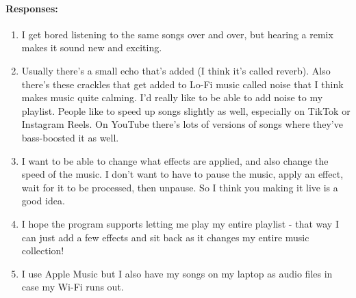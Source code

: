 {{\begin{minipage}{15cm}
			\paragraph{Responses:}
			\begin{enumerate}
				\item I get bored listening to the same songs over and over, but hearing a remix makes it sound new and exciting.
				\item Usually there's a small echo that's added (I think it's called reverb). Also there's these crackles that get added to Lo-Fi music called noise that I think makes music quite calming. I'd really like to be able to add noise to my playlist. People like to speed up songs slightly as well, especially on TikTok or Instagram Reels. On YouTube there's lots of versions of songs where they've bass-boosted it as well. 
				\item I want to be able to change what effects are applied, and also change the speed of the music. I don't want to have to pause the music, apply an effect, wait for it to be processed, then unpause. So I think you making it live is a good idea.
				\item I hope the program supports letting me play my entire playlist - that way I can just add a few effects and sit back as it changes my entire music collection!
				\item I use Apple Music but I also have my songs on my laptop as audio files in case my Wi-Fi runs out. 
			\end{enumerate}
			\bigskip \bigskip \bigskip
	\end{minipage}}
}

\pagebreak
